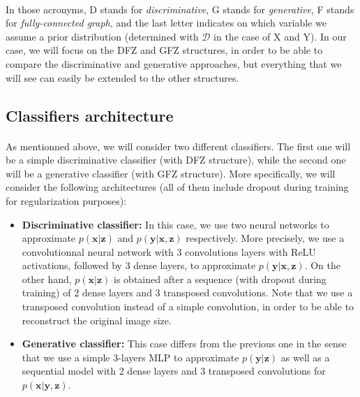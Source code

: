 \documentclass[10pt,twocolumn,letterpaper]{article}
\begin{document}
\paragraph{} In those acronyms, D stands for \textit{discriminative}, G stands for \textit{generative}, F stands for \textit{fully-connected graph}, and the last letter indicates on which variable we assume a prior distribution (determined with $\mathcal{D}$ in the case of X and Y). In our case, we will focus on the DFZ and GFZ structures, in order to be able to compare the discriminative and generative approaches, but everything that we will see can easily be extended to the other structures.

\subsection{Classifiers architecture}

\paragraph{} As mentionned above, we will consider two different classifiers. The first one will be a simple discriminative classifier (with DFZ structure), while the second one will be a generative classifier (with GFZ structure). More specifically, we will consider the following architectures (all of them include dropout during training for regularization purposes):

\begin{itemize}
    \item \textbf{Discriminative classifier:} In this case, we use two neural networks to approximate $p(\bm{x}|\bm{z})$ and $p(\bm{y}|\bm{x}, \bm{z})$ respectively. More precisely, we use a convolutionnal neural network with 3 convolutions layers with ReLU activations, followed by 3 dense layers, to approximate $p(\bm{y}|\bm{x}, \bm{z})$. On the other hand, $p(\bm{x}|\bm{z})$ is obtained after a sequence (with dropout during training) of 2 dense layers and 3 transposed convolutions. Note that we use a transposed convolution instead of a simple convolution, in order to be able to reconstruct the original image size. 
    \item \textbf{Generative classifier:} This case differs from the previous one in the sense that we use a simple 3-layers MLP to approximate $p(\bm{y}|\bm{z})$ as well as a sequential model with 2 dense layers and 3 transposed convolutions for $p(\bm{x}|\bm{y}, \bm{z})$.
\end{itemize}
\end{document}
